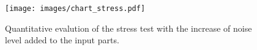 \begin{figure}[!t]
  \texttt{[image: images/chart\_stress.pdf]}
  \caption{Quantitative evalution of the stress test with the increase of noise level added to the input parts.}
  \label{fig:chart_stress}
\end{figure}
